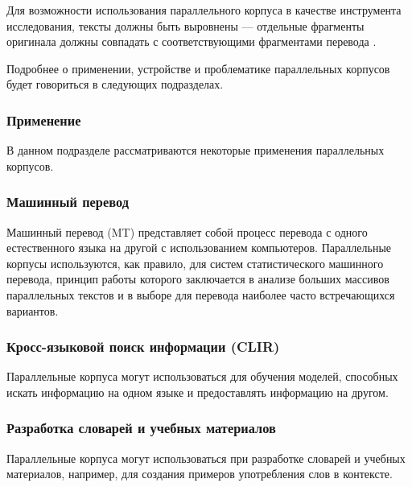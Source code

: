 Для возможности использования параллельного корпуса в качестве инструмента исследования, тексты должны быть выровнены --- отдельные фрагменты оригинала должны совпадать с соответствующими фрагментами перевода \cite{postnauka}.

Подробнее о применении, устройстве и проблематике параллельных корпусов будет говориться в следующих подразделах.

\subsubsection{Применение}

В данном подразделе рассматриваются некоторые применения параллельных корпусов.

\subsubsection*{Машинный перевод}

Машинный перевод (MT) представляет собой процесс перевода с одного естественного языка на другой с использованием компьютеров.
Параллельные корпусы используются, как правило, для систем статистического машинного перевода, принцип работы которого заключается в анализе больших массивов параллельных текстов и в выборе для перевода наиболее часто встречающихся вариантов.



\subsubsection*{Кросс-языковой поиск информации (CLIR)}

Параллельные корпуса могут использоваться для обучения моделей, способных искать информацию на одном языке и предоставлять информацию на другом.

\subsubsection*{Разработка словарей и учебных материалов}

Параллельные корпуса могут использоваться при разработке словарей и учебных материалов, например, для создания примеров употребления слов в контексте.

